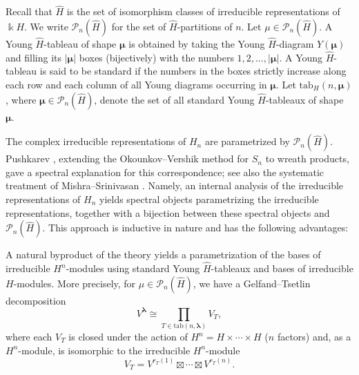 \documentclass[12pt]{amsart}
\numberwithin{itemcounter}{subsection}
\theoremstyle{plain}
\theoremstyle{definition}
\theoremstyle{remark}
\numberwithin{equation}{section}
\def\k{\Bbbk}
\def\calP{\mathcal{P}}
\newcommand*{\tuple}[1]
{\boldsymbol{#1}}
\begin{document}
									Recall that $\hat H $ is the set of isomorphism classes of irreducible representations of $\k H .$
									We write $\calP_n(\hat H )$ for the set of
									$\hat H $-partitions of $n$. Let $\mu \in \calP_n(\hat H )$. A Young $\hat H $-tableau of shape $\tuple \mu$ is obtained by taking the Young $\hat H $-diagram $Y(\tuple \mu)$ and filling its $|\tuple\mu |$ boxes (bijectively) with the numbers $1, 2, \ldots, |\tuple\mu|$. A Young $\hat H $-tableau is said to be standard if the numbers in the boxes strictly increase along each row and each column of all Young diagrams occurring in $\tuple\mu$. Let $\mathrm{tab}_ H (n, \tuple\mu)$, where $\tuple\mu \in \calP_n(\hat H )$, denote the set of all standard Young $\hat H $-tableaux of shape $\tuple\mu.$

									The complex irreducible representations of $H_n$ are parametrized by $\calP_n(\hat H )$.
									Pushkarev \cite{Pus99}, extending the Okounkov--Vershik method for $S_n$ \cite{OV96} to wreath products, gave a spectral explanation for this correspondence; see also the systematic treatment of Mishra--Srinivasan \cite{MS16}.  Namely, an internal analysis of the irreducible representations of $ H _n$ yields spectral objects parametrizing the irreducible representations, together with a bijection between these spectral objects and $\calP_n(\hat H )$. This approach is inductive in nature and has the following advantages:

									A natural byproduct of the theory yields a parametrization of the bases of
									irreducible $ H ^n$-modules using standard Young $\hat H $-tableaux and bases of irreducible $ H $-modules. More precisely, for $\mu \in \calP_n(\hat H )$, we have a Gelfand--Tsetlin decomposition
									$$V^{\tuple\lambda}\cong \prod\limits_{T\in \mathrm{tab}(n,\tuple\lambda)} V_T,$$
									where each $V_T$ is closed under the action of $ H ^n = H  \times\cdots \times  H $ ($n$ factors) and, as a
									$ H ^n$-module, is isomorphic to the irreducible $ H ^n$-module
									$$ V_T=V^{r_T(1)}\boxtimes \cdots\boxtimes V^{r_T(n)}.$$
\end{document}
